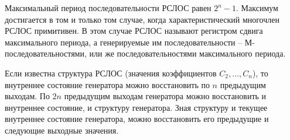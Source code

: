 \exampleend

Максимальный период последовательности РСЛОС равен $2^n - 1$. Максимум достигается в том и только том случае, когда характеристический многочлен РСЛОС примитивен. В этом случае РСЛОС называют регистром сдвига максимального периода, а генерируемые им последовательности -- М-последовательностями, или же последовательностями максимального периода.

Если известна структура РСЛОС (значения коэффициентов $C_2, \dots, C_n$), то внутреннее состояние генератора можно восстановить по $n$ предыдущим выходам. По $2n$ предыдущим выходам генератора можно восстановить и внутреннее состояние, и структуру генератора. Зная структуру и текущее внутреннее состояние генератора, можно восстановить его предыдущие и следующие выходные значения.
